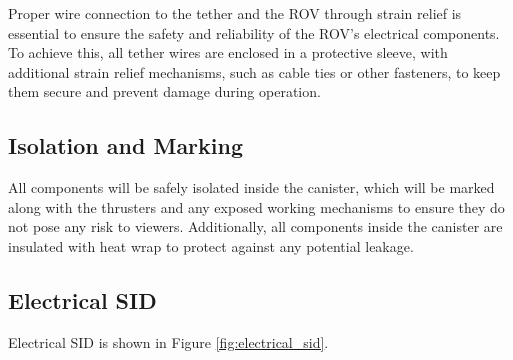 \documentclass[11pt, twocolumn]{article}
\begin{document}
Proper wire connection to the tether and the ROV through strain relief is essential to ensure the safety and reliability of the ROV’s electrical components. To achieve this, all tether wires are enclosed in a protective sleeve, with additional strain relief mechanisms, such as cable ties or other fasteners, to keep them secure and prevent damage during operation.

\subsection{Isolation and Marking}

All components will be safely isolated inside the canister, which will be marked along with the thrusters and any exposed working mechanisms to ensure they do not pose any risk to viewers. Additionally, all components inside the canister are insulated with heat wrap to protect against any potential leakage.

\subsection{Electrical SID}

Electrical SID is shown in Figure \ref{fig:electrical_sid}.
\end{document}
